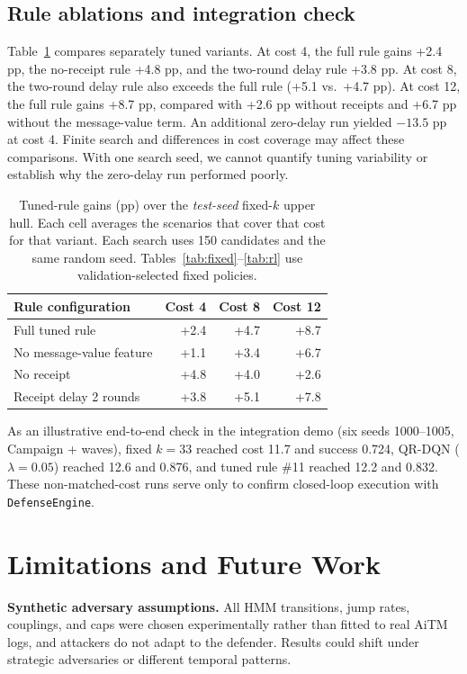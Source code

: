 \documentclass[10pt,twocolumn]{article}
\begin{document}
\subsection{Rule ablations and integration check}
Table~\ref{tab:rule} compares separately tuned variants. At cost 4, the full rule gains +2.4 pp, the no-receipt rule +4.8 pp, and the two-round delay rule +3.8 pp. At cost 8, the two-round delay rule also exceeds the full rule (+5.1 vs.\ +4.7 pp). At cost 12, the full rule gains +8.7 pp, compared with +2.6 pp without receipts and +6.7 pp without the message-value term. An additional zero-delay run yielded $-13.5$ pp at cost 4. Finite search and differences in cost coverage may affect these comparisons. With one search seed, we cannot quantify tuning variability or establish why the zero-delay run performed poorly.

\begin{table}[t]
\centering
\caption{Tuned-rule gains (pp) over the \emph{test-seed} fixed-$k$ upper hull. Each cell averages the scenarios that cover that cost for that variant. Each search uses 150 candidates and the same random seed. Tables~\ref{tab:fixed}--\ref{tab:rl} use validation-selected fixed policies.}
\label{tab:rule}
\footnotesize
\setlength{\tabcolsep}{4.2pt}
\begin{tabular}{@{}lrrr@{}}
\toprule
Rule configuration & Cost 4 & Cost 8 & Cost 12\\
\midrule
Full tuned rule & +2.4 & +4.7 & +8.7\\
No message-value feature & +1.1 & +3.4 & +6.7\\
No receipt & +4.8 & +4.0 & +2.6\\
Receipt delay 2 rounds & +3.8 & +5.1 & +7.8\\
\bottomrule
\end{tabular}
\end{table}

As an illustrative end-to-end check in the integration demo (six seeds 1000--1005, Campaign + waves), fixed $k=33$ reached cost 11.7 and success 0.724, QR-DQN ($\lambda=0.05$) reached 12.6 and 0.876, and tuned rule \#11 reached 12.2 and 0.832. These non-matched-cost runs serve only to confirm closed-loop execution with \texttt{DefenseEngine}.

\section{Limitations and Future Work}
\textbf{Synthetic adversary assumptions.} All HMM transitions, jump rates, couplings, and caps were chosen experimentally rather than fitted to real AiTM logs, and attackers do not adapt to the defender. Results could shift under strategic adversaries or different temporal patterns.
\end{document}
